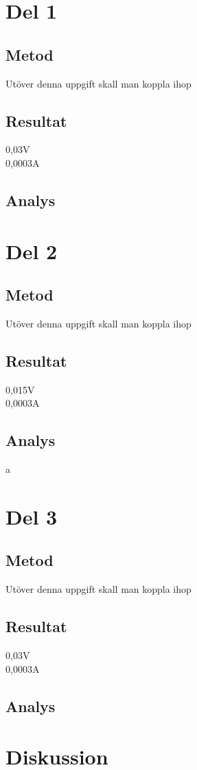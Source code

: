 \documentclass[11p]{article}
\begin{document}
    \section{Del 1}

    \subsection{Metod}
    Utöver denna uppgift skall man koppla ihop

    \subsection{Resultat}
    0,03V \\
    0,0003A \\

    \subsection{Analys}


    \section{Del 2}

    \subsection{Metod}
    Utöver denna uppgift skall man koppla ihop

    \subsection{Resultat}
        0,015V \\
        0,0003A \\

    \subsection{Analys}
    a

    \section{Del 3}
    \subsection{Metod}
    Utöver denna uppgift skall man koppla ihop

    \subsection{Resultat}
        0,03V \\
        0,0003A \\

    \subsection{Analys}


    \section{Diskussion}
\end{document}

